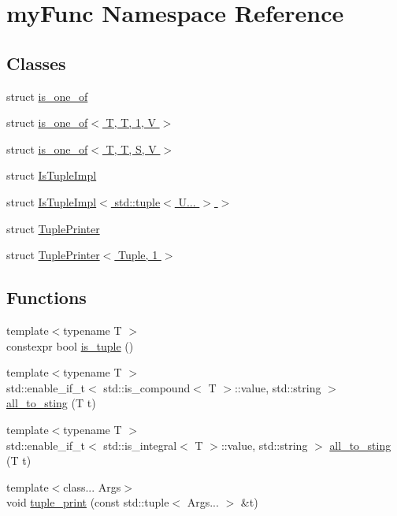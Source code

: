 \hypertarget{namespacemyFunc}{}\section{my\+Func Namespace Reference}
\label{namespacemyFunc}
\subsection*{Classes}
\begin{DoxyCompactItemize}
\item 
struct \hyperlink{structmyFunc_1_1is__one__of}{is\+\_\+one\+\_\+of}
\item 
struct \hyperlink{structmyFunc_1_1is__one__of_3_01T_00_01T_00_011_00_01V_01_4}{is\+\_\+one\+\_\+of$<$ T, T, 1, V $>$}
\item 
struct \hyperlink{structmyFunc_1_1is__one__of_3_01T_00_01T_00_01S_00_01V_01_4}{is\+\_\+one\+\_\+of$<$ T, T, S, V $>$}
\item 
struct \hyperlink{structmyFunc_1_1IsTupleImpl}{Is\+Tuple\+Impl}
\item 
struct \hyperlink{structmyFunc_1_1IsTupleImpl_3_01std_1_1tuple_3_01U_8_8_8_01_4_01_4}{Is\+Tuple\+Impl$<$ std\+::tuple$<$ U... $>$ $>$}
\item 
struct \hyperlink{structmyFunc_1_1TuplePrinter}{Tuple\+Printer}
\item 
struct \hyperlink{structmyFunc_1_1TuplePrinter_3_01Tuple_00_011_01_4}{Tuple\+Printer$<$ Tuple, 1 $>$}
\end{DoxyCompactItemize}
\subsection*{Functions}
\begin{DoxyCompactItemize}
\item 
{\footnotesize template$<$typename T $>$ }\\constexpr bool \hyperlink{namespacemyFunc_a5049c45cb05d01e0ded3e2e2d15b3c61}{is\+\_\+tuple} ()
\item 
{\footnotesize template$<$typename T $>$ }\\std\+::enable\+\_\+if\+\_\+t$<$ std\+::is\+\_\+compound$<$ T $>$\+::value, std\+::string $>$ \hyperlink{namespacemyFunc_a3f0d86a5a675a3cdfae97fe12405c6a9}{all\+\_\+to\+\_\+sting} (T t)
\item 
{\footnotesize template$<$typename T $>$ }\\std\+::enable\+\_\+if\+\_\+t$<$ std\+::is\+\_\+integral$<$ T $>$\+::value, std\+::string $>$ \hyperlink{namespacemyFunc_a0f43f87e3f2dd85a251414972b68e033}{all\+\_\+to\+\_\+sting} (T t)
\item 
{\footnotesize template$<$class... Args$>$ }\\void \hyperlink{namespacemyFunc_a6588b7e742bf09aefea7d531f5c8ca6e}{tuple\+\_\+print} (const std\+::tuple$<$ Args... $>$ \&t)
\end{DoxyCompactItemize}


